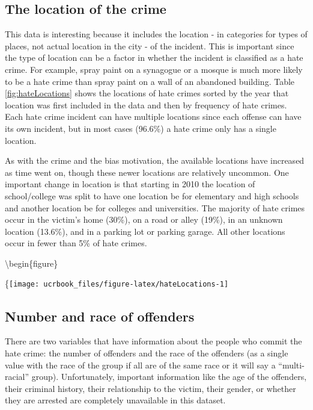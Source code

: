 \documentclass[
  12pt,
  openany]{book}
\begin{document}
\hypertarget{the-location-of-the-crime}{%
\subsection{The location of the crime}\label{the-location-of-the-crime}}

This data is interesting because it includes the location - in categories for types of places, not actual location in the city - of the incident. This is important since the type of location can be a factor in whether the incident is classified as a hate crime. For example, spray paint on a synagogue or a mosque is much more likely to be a hate crime than spray paint on a wall of an abandoned building. Table \ref{fig:hateLocations} shows the locations of hate crimes sorted by the year that location was first included in the data and then by frequency of hate crimes. Each hate crime incident can have multiple locations since each offense can have its own incident, but in most cases (96.6\%) a hate crime only has a single location.

As with the crime and the bias motivation, the available locations have increased as time went on, though these newer locations are relatively uncommon. One important change in location is that starting in 2010 the location of school/college was split to have one location be for elementary and high schools and another location be for colleges and universities. The majority of hate crimes occur in the victim's home (30\%), on a road or alley (19\%), in an unknown location (13.6\%), and in a parking lot or parking garage. All other locations occur in fewer than 5\% of hate crimes.

\textbackslash begin\{figure\}

\{\centering \texttt{[image: ucrbook\_files/figure-latex/hateLocations-1]}

\hypertarget{number-and-race-of-offenders}{%
\subsection{Number and race of offenders}\label{number-and-race-of-offenders}}

There are two variables that have information about the people who commit the hate crime: the number of offenders and the race of the offenders (as a single value with the race of the group if all are of the same race or it will say a ``multi-racial'' group). Unfortunately, important information like the age of the offenders, their criminal history, their relationship to the victim, their gender, or whether they are arrested are completely unavailable in this dataset.
\end{document}
